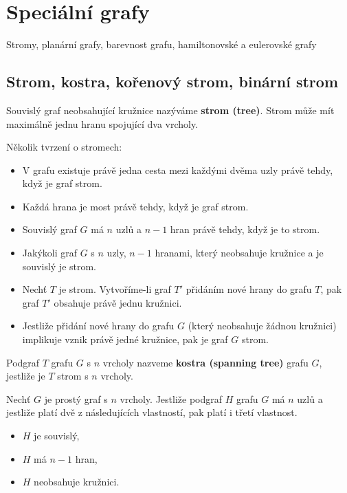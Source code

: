 \section{Speciální grafy}
Stromy, planární grafy, barevnost grafu, hamiltonovské a eulerovské grafy

\subsection{Strom, kostra, kořenový strom, binární strom}

\begin{definition}
Souvislý graf neobsahující kružnice nazýváme \textbf{strom (tree)}. Strom může mít maximálně jednu hranu spojující dva vrcholy.
\end{definition}


\begin{theorem}
Několik tvrzení o stromech:
\begin{itemize}
    \item V grafu existuje právě jedna cesta mezi každými dvěma uzly právě tehdy, když je graf strom.
    \item Každá hrana je most právě tehdy, když je graf strom.
    \item Souvislý graf $G$ má $n$ uzlů a $n-1$ hran právě tehdy, když je to strom.
    \item Jakýkoli graf $G$ s $n$ uzly, $n-1$ hranami, který neobsahuje kružnice a je souvislý je strom.
    \item Nechť $T$ je strom. Vytvoříme-li graf $T'$ přidáním nové hrany do grafu $T$, pak graf $T'$ obsahuje právě jednu kružnici.
    \item Jestliže přidání nové hrany do grafu $G$ (který neobsahuje žádnou kružnici) implikuje vznik právě jedné kružnice, pak je graf $G$ strom.
\end{itemize}
\end{theorem}

\begin{definition}
Podgraf $T$ grafu $G$ s $n$ vrcholy nazveme \textbf{kostra (spanning tree)} grafu $G$, jestliže je $T$ strom s $n$ vrcholy.
\end{definition}

\begin{theorem}
Nechť $G$ je prostý graf s $n$ vrcholy. Jestliže podgraf $H$ grafu $G$ má $n$ uzlů a jestliže platí dvě z následujících vlastností, pak platí i třetí vlastnost.
\begin{itemize}
    \item $H$ je souvislý,
    \item $H$ má $n-1$ hran,
    \item $H$ neobsahuje kružnici.
\end{itemize}
\end{theorem}

